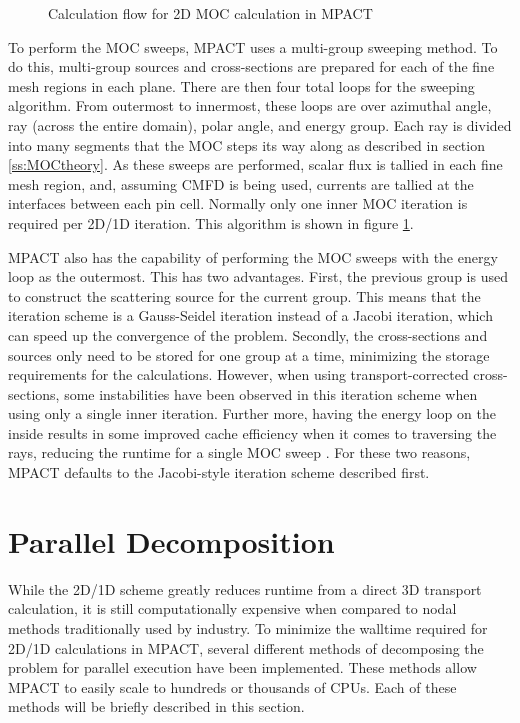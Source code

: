 \begin{figure}[h]
  \centering
  
  \caption{Calculation flow for 2D MOC calculation in MPACT}\label{f:MOC-flowchart}
\end{figure}

To perform the MOC sweeps, MPACT uses a multi-group sweeping method.  To do this, multi-group sources and cross-sections are prepared for each of the fine mesh regions in each plane.  There are then four total loops for the sweeping algorithm.  From outermost to innermost, these loops are over azimuthal angle, ray (across the entire domain), polar angle, and energy group.  Each ray is divided into many segments that the MOC steps its way along as described in section \ref{ss:MOCtheory}.  As these sweeps are performed, scalar flux is tallied in each fine mesh region, and, assuming CMFD is being used, currents are tallied at the interfaces between each pin cell.  Normally only one inner MOC iteration is required per 2D/1D iteration.  This algorithm is shown in figure \ref{f:MOC-flowchart}.

MPACT also has the capability of performing the MOC sweeps with the energy loop as the outermost.  This has two advantages.  First, the previous group is used to construct the scattering source for the current group.  This means that the iteration scheme is a Gauss-Seidel iteration instead of a Jacobi iteration, which can speed up the convergence of the problem.  Secondly, the cross-sections and sources only need to be stored for one group at a time, minimizing the storage requirements for the calculations.  However, when using transport-corrected cross-sections, some instabilities have been observed in this iteration scheme when using only a single inner iteration.  Further more, having the energy loop on the inside results in some improved cache efficiency when it comes to traversing the rays, reducing the runtime for a single MOC sweep \cite{JacobiInscatterTechReport}.  For these two reasons, MPACT defaults to the Jacobi-style iteration scheme described first.

\section{Parallel Decomposition}

While the 2D/1D scheme greatly reduces runtime from a direct 3D transport calculation, it is still computationally expensive when compared to nodal methods traditionally used by industry.  To minimize the walltime required for 2D/1D calculations in MPACT, several different methods of decomposing the problem for parallel execution have been implemented.  These methods allow MPACT to easily scale to hundreds or thousands of CPUs.  Each of these methods will be briefly described in this section.

